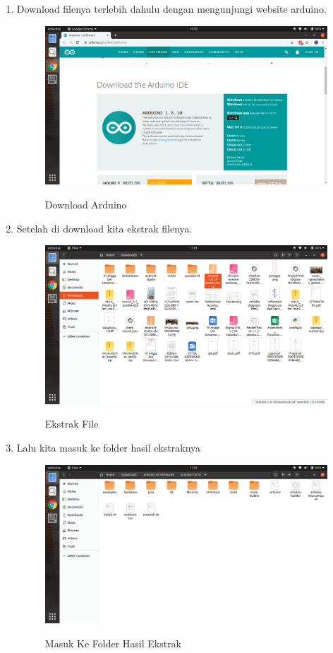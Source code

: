 \begin{enumerate}
\item Download filenya terlebih dahulu dengan mengunjungi website arduino.
\begin{figure}[H]
\centering
\caption{Download Arduino}
\includegraphics[width=1\textwidth]{figures/1.png}
\label{downloadarduinosoftware}
\end{figure}

\item Setelah di download kita ekstrak filenya.
\begin{figure}[H]
\centering
\caption{Ekstrak File}
\includegraphics[width=1\textwidth]{figures/2.png}
\label{ekstrakfilearduino}
\end{figure}

\item Lalu kita masuk ke folder hasil ekstraknya
\begin{figure}[H]
\centering
\caption{Masuk Ke Folder Hasil Ekstrak}
\includegraphics[width=1\textwidth]{figures/3.png}
\label{masukfolderarduino}
\end{figure}


\end{enumerate}
